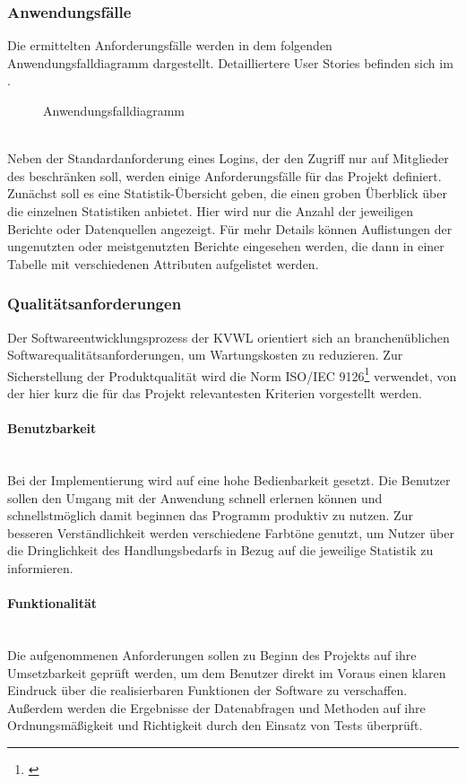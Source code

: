\subsubsection{Anwendungsfälle}
\label{sec:Anwendungsfaelle}
Die ermittelten Anforderungsfälle werden in dem folgenden Anwendungsfalldiagramm dargestellt. Detailliertere User Stories befinden sich im .
\begin{figure}[htb]
	\centering
	\caption{Anwendungsfalldiagramm}
	\label{fig:Anwendungsfalldiagramm}
\end{figure}\\
Neben der Standardanforderung eines Logins, der den Zugriff nur auf Mitglieder des \teamName beschränken soll, werden einige Anforderungsfälle für das Projekt definiert. Zunächst soll es eine Statistik-Übersicht geben, die einen groben Überblick über die einzelnen Statistiken anbietet. Hier wird nur die Anzahl der jeweiligen Berichte oder Datenquellen angezeigt. Für mehr Details können Auflistungen \zB der ungenutzten oder meistgenutzten Berichte eingesehen werden, 
die dann in einer Tabelle mit verschiedenen Attributen aufgelistet werden.

\subsubsection{Qualitätsanforderungen}
\label{sec:Qualitaetsanforderungen}
Der Softwareentwicklungsprozess der \ac{KVWL} orientiert sich an branchenüblichen Softwarequalitätsanforderungen, um Wartungskosten zu reduzieren. Zur Sicherstellung der Produktqualität wird die Norm ISO/IEC 9126\footnote{\cite{ISO9126}} verwendet, von der hier kurz die für das Projekt relevantesten Kriterien vorgestellt werden.

\paragraph{Benutzbarkeit} ~\\
\label{p:Benutzbarkeit}
Bei der Implementierung wird auf eine hohe Bedienbarkeit gesetzt. Die Benutzer sollen den Umgang mit der Anwendung schnell erlernen können und schnellstmöglich damit beginnen das Programm produktiv zu nutzen. Zur besseren Verständlichkeit werden verschiedene Farbtöne genutzt, um Nutzer über die Dringlichkeit des Handlungsbedarfs in Bezug auf die jeweilige Statistik zu informieren.

\paragraph{Funktionalität} ~\\
\label{p:Funktionalitaet}
Die aufgenommenen Anforderungen sollen zu Beginn des Projekts auf ihre Umsetzbarkeit geprüft werden, um dem Benutzer direkt im Voraus einen klaren Eindruck über die realisierbaren Funktionen der Software zu verschaffen. Außerdem werden die Ergebnisse der Datenabfragen und Methoden auf ihre Ordnungsmäßigkeit und Richtigkeit durch den Einsatz von Tests überprüft.

